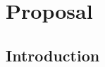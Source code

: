 
\chapter{Proposal} %

\label{Proposal} %

\newcommand{\keyword}[1]{\textbf{\#1}}
\newcommand{\tabhead}[1]{\textbf{\#1}}
\newcommand{\code}[1]{\texttt{\#1}}
\newcommand{\file}[1]{\texttt{\bfseries\#1}}
\newcommand{\option}[1]{\texttt{\itshape\#1}}


\section{Introduction}

